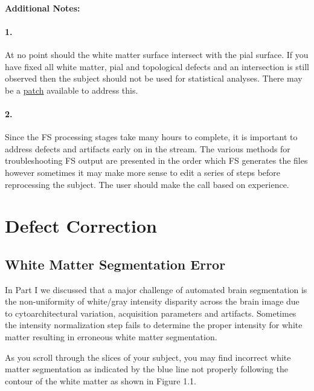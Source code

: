 \documentclass[paper=a4, fontsize=11pt]{scrartcl} %
\numberwithin{equation}{section} %
\numberwithin{figure}{section} %
\numberwithin{table}{section} %
\begin{document}
\paragraph{Additional Notes:}  \paragraph{1.} At no point should the white matter surface intersect with the pial surface. If you have fixed all white matter, pial and topological defects and an intersection is still observed then the subject should not be used for statistical analyses.  There may be a \href{https://www.mail-archive.com/freesurfer%40nmr.mgh.harvard.edu/msg39636.html}{patch} available to address this.
\paragraph{2.} Since the FS processing stages take many hours to complete, it is important to address defects and artifacts early on in the stream.  The various methods for troubleshooting FS output are presented in the order which FS generates the files however sometimes it may make more sense to edit a series of steps before reprocessing the subject.  The user should make the call based on experience.



\section{Defect Correction}
\subsection{White Matter Segmentation Error}\label{ss:wser} In Part I we discussed that a major challenge of automated brain segmentation is the non-uniformity of white/gray intensity disparity across the brain image due to cytoarchitectural variation, acquisition parameters and artifacts.  Sometimes the intensity normalization step fails to determine the proper intensity for white matter resulting in erroneous white matter segmentation. 

As you scroll through the slices of your subject, you may find incorrect white matter segmentation as indicated by the blue line not properly following the contour of the white matter as shown in Figure 1.1.
\end{document}
